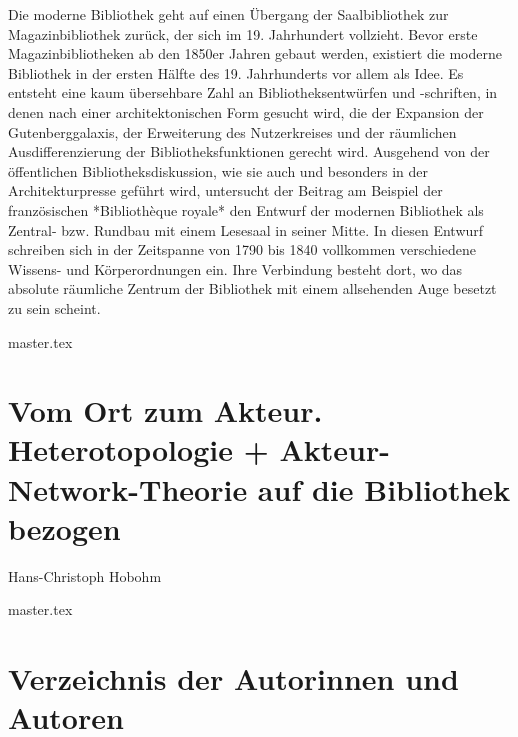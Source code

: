 \documentclass[10.5pt,a5paper,twoside]{memoir}
\makeatletter
\DeclareRobustCommand\authortoctext[1]{%
{\addvspace{20pt}\nopagebreak\leftskip0em\relax
\rightskip \@tocrmarg\relax
\noindent\itshape#1\par\addvspace{-7pt}}}
\newcommand\authortoc[1]{%
  \gdef\chapterauthor{#1}%
  \addtocontents{toc}{\authortoctext{#1}}}
\makeatother
\begin{document}
{\small
	Die moderne Bibliothek geht auf einen Übergang der Saalbibliothek zur 
Magazinbibliothek zurück, der sich im 19. Jahrhundert vollzieht. Bevor
erste Magazinbibliotheken ab den 1850er Jahren gebaut werden, existiert
die moderne Bibliothek in der ersten Hälfte des 19. Jahrhunderts vor
allem als Idee. Es entsteht eine kaum übersehbare Zahl an
Bibliotheksentwürfen und -schriften, in denen nach einer
architektonischen Form gesucht wird, die der Expansion der
Gutenberggalaxis, der Erweiterung des Nutzerkreises und der räumlichen
Ausdifferenzierung der Bibliotheksfunktionen gerecht wird. Ausgehend von
der öffentlichen Bibliotheksdiskussion, wie sie auch und besonders in
der Architekturpresse geführt wird, untersucht der Beitrag am Beispiel
der französischen *Bibliothèque royale* den Entwurf der modernen
Bibliothek als Zentral- bzw. Rundbau mit einem Lesesaal in seiner Mitte.
In diesen Entwurf schreiben sich in der Zeitspanne von 1790 bis 1840
vollkommen verschiedene Wissens- und Körperordnungen ein. Ihre
Verbindung besteht dort, wo das absolute räumliche Zentrum der
Bibliothek mit einem allsehenden Auge besetzt zu sein scheint.}

\vspace{5mm}

{master.tex}


\authortoc{Hans-Christoph Hobohm}
\chapter*[Vom Ort zum Akteur]{Vom Ort zum Akteur. Heterotopologie + Akteur-Network-Theorie auf die Bibliothek bezogen}
\begin{flushright}
{\large Hans-Christoph Hobohm}
\end{flushright}

\vspace{5mm}

{master.tex}


\chapter*[Verzeichnis der Autorinnen und Autoren]{Verzeichnis der Autorinnen und Autoren}
\end{document}
